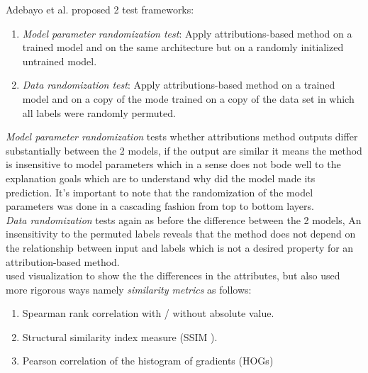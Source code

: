 \documentclass[12pt]{report}
\begin{document}
Adebayo et al. \cite{https://doi.org/10.48550/arxiv.1810.03292} proposed 2 test frameworks: 
\begin{enumerate}
	\item \textit{Model parameter randomization test}: Apply attributions-based method on a trained model and on the same architecture but on a randomly initialized untrained model.
	\item \textit{Data randomization test}: Apply attributions-based method on a trained model and on a copy of the mode trained on a copy of the data set in which all labels were randomly permuted.
\end{enumerate}

\textit{Model parameter randomization} tests whether attributions method outputs differ substantially between the 2 models, if the output are similar it means the method is insensitive to model parameters which in a sense does not bode well to the explanation goals which are to understand why did the model made its prediction. It's important to note that the randomization of the model parameters was done in a cascading fashion from top to bottom layers. \\

\textit{Data randomization} tests again as before the difference between the 2 models, An insensitivity to the permuted labels reveals that the method does not depend on the relationship between input and labels which is not a desired property for an attribution-based method. \\

\cite{https://doi.org/10.48550/arxiv.1810.03292} used visualization to show the the differences in the attributes, but also used more rigorous ways namely \textit{similarity metrics} as follows:
\begin{enumerate}
	\item Spearman rank correlation with / without  absolute value.
	\item Structural similarity index measure (SSIM \cite{1284395}).
	\item Pearson correlation of the histogram of gradients (HOGs)
\end{enumerate}
\end{document}
